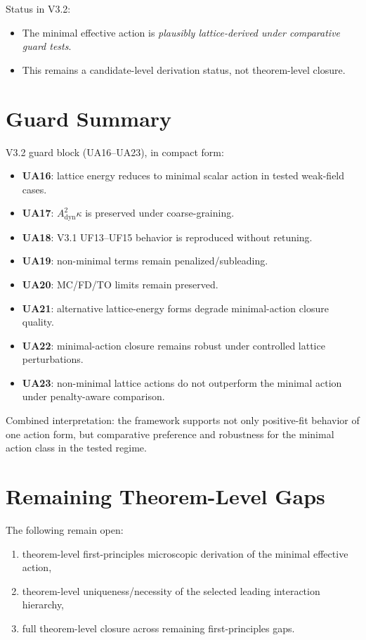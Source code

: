 \documentclass[11pt,a4paper]{article}
\begin{document}
\noindent
Status in V3.2:
\begin{itemize}[leftmargin=1.5em]
\item The minimal effective action is \emph{plausibly lattice-derived under comparative guard tests}.
\item This remains a candidate-level derivation status, not theorem-level closure.
\end{itemize}

\section{Guard Summary}
V3.2 guard block (UA16--UA23), in compact form:
\begin{itemize}[leftmargin=1.5em]
\item \textbf{UA16}: lattice energy reduces to minimal scalar action in tested weak-field cases.
\item \textbf{UA17}: $A_{\mathrm{dyn}}^2\kappa$ is preserved under coarse-graining.
\item \textbf{UA18}: V3.1 UF13--UF15 behavior is reproduced without retuning.
\item \textbf{UA19}: non-minimal terms remain penalized/subleading.
\item \textbf{UA20}: MC/FD/TO limits remain preserved.
\item \textbf{UA21}: alternative lattice-energy forms degrade minimal-action closure quality.
\item \textbf{UA22}: minimal-action closure remains robust under controlled lattice perturbations.
\item \textbf{UA23}: non-minimal lattice actions do not outperform the minimal action under penalty-aware comparison.
\end{itemize}

\noindent
Combined interpretation: the framework supports not only positive-fit behavior of one action form, but comparative preference and robustness for the minimal action class in the tested regime.

\section{Remaining Theorem-Level Gaps}
The following remain open:
\begin{enumerate}[leftmargin=1.5em]
\item theorem-level first-principles microscopic derivation of the minimal effective action,
\item theorem-level uniqueness/necessity of the selected leading interaction hierarchy,
\item full theorem-level closure across remaining first-principles gaps.
\end{enumerate}
\end{document}
